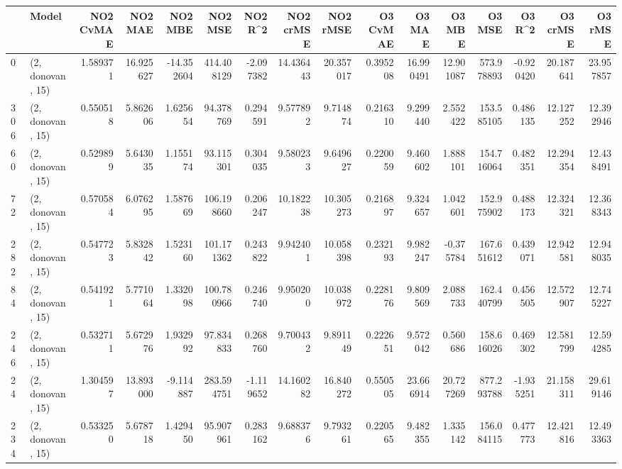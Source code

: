 \begin{tabular}{llrrrrrrrrrrrrrr}
\toprule
{} &             Model &  NO2 CvMAE &    NO2 MAE &    NO2 MBE &      NO2 MSE &    NO2 R\textasciicircum2 &  NO2 crMSE &   NO2 rMSE &  O3 CvMAE &     O3 MAE &     O3 MBE &       O3 MSE &     O3 R\textasciicircum2 &   O3 crMSE &    O3 rMSE \\
\midrule
0   &  (2, donovan, 15) &   1.589371 &  16.925627 & -14.352604 &   414.408129 &  -2.097382 &  14.436443 &  20.357017 &  0.395208 &  16.990491 &  12.901087 &   573.978893 &  -0.920420 &  20.187641 &  23.957857 \\
306 &  (2, donovan, 15) &   0.550518 &   5.862606 &   1.625654 &    94.378769 &   0.294591 &   9.577892 &   9.714874 &  0.216310 &   9.299440 &   2.552422 &   153.585105 &   0.486135 &  12.127252 &  12.392946 \\
60  &  (2, donovan, 15) &   0.529899 &   5.643035 &   1.155174 &    93.115301 &   0.304035 &   9.580233 &   9.649627 &  0.220059 &   9.460602 &   1.888101 &   154.716064 &   0.482351 &  12.294354 &  12.438491 \\
72  &  (2, donovan, 15) &   0.570584 &   6.076295 &   1.587669 &   106.198660 &   0.206247 &  10.182238 &  10.305273 &  0.216897 &   9.324657 &   1.042601 &   152.975902 &   0.488173 &  12.324321 &  12.368343 \\
282 &  (2, donovan, 15) &   0.547723 &   5.832842 &   1.523160 &   101.171362 &   0.243822 &   9.942401 &  10.058398 &  0.232193 &   9.982247 &  -0.375784 &   167.651612 &   0.439071 &  12.942581 &  12.948035 \\
84  &  (2, donovan, 15) &   0.541921 &   5.771064 &   1.332098 &   100.780966 &   0.246740 &   9.950200 &  10.038972 &  0.228176 &   9.809569 &   2.088733 &   162.440799 &   0.456505 &  12.572907 &  12.745227 \\
246 &  (2, donovan, 15) &   0.532711 &   5.672976 &   1.932992 &    97.834833 &   0.268760 &   9.700432 &   9.891149 &  0.222651 &   9.572042 &   0.560686 &   158.616026 &   0.469302 &  12.581799 &  12.594285 \\
24  &  (2, donovan, 15) &   1.304597 &  13.893000 &  -9.114887 &   283.594751 &  -1.119652 &  14.160282 &  16.840272 &  0.550505 &  23.666914 &  20.727269 &   877.293788 &  -1.935251 &  21.158311 &  29.619146 \\
234 &  (2, donovan, 15) &   0.533250 &   5.678718 &   1.429450 &    95.907961 &   0.283162 &   9.688376 &   9.793261 &  0.220565 &   9.482355 &   1.335142 &   156.084115 &   0.477773 &  12.421816 &  12.493363 \\

\end{tabular}
